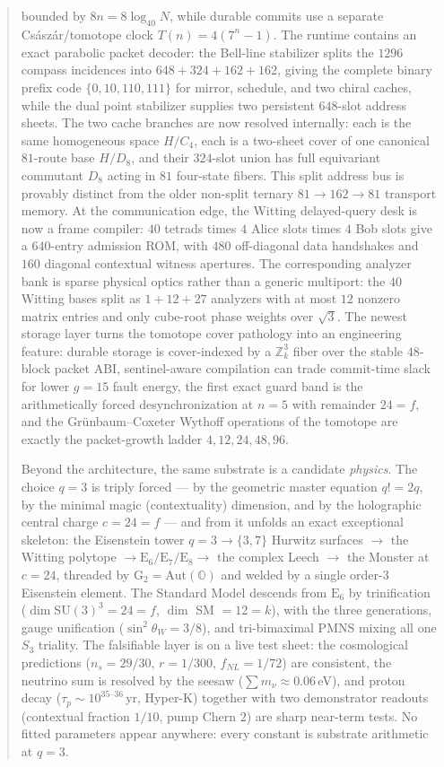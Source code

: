 \documentclass[11pt]{article}
\begin{document}
\begin{abstract}
bounded by $8n=8\log_{40}N$, while durable commits use a separate
Cs\'asz\'ar/tomotope clock $T(n)=4(7^n-1)$.  The runtime contains an
exact parabolic packet decoder: the Bell-line stabilizer splits the
    $1296$ compass incidences into $648+324+162+162$, giving the complete
    binary prefix code $\{0,10,110,111\}$ for mirror, schedule, and two
    chiral caches, while the dual point stabilizer supplies two persistent
    $648$-slot address sheets.  The two cache branches are now resolved
    internally: each is the same homogeneous space $H/C_4$, each is a
    two-sheet cover of one canonical $81$-route base $H/D_8$, and their
    $324$-slot union has full equivariant commutant $D_8$ acting in $81$
    four-state fibers.  This split address bus is provably distinct from
    the older non-split ternary $81\to162\to81$ transport memory.  At the
    communication edge, the Witting delayed-query desk is now a frame
    compiler: $40$ tetrads times $4$ Alice slots times $4$ Bob slots give
    a $640$-entry admission ROM, with $480$ off-diagonal data handshakes
    and $160$ diagonal contextual witness apertures.  The corresponding
    analyzer bank is sparse physical optics rather than a generic multiport:
    the $40$ Witting bases split as $1+12+27$ analyzers with at most $12$
    nonzero matrix entries and only cube-root phase weights over $\sqrt3$.
    The newest storage layer
turns the tomotope cover pathology into an engineering feature: durable
storage is cover-indexed by a $\mathbb{Z}_k^3$ fiber over the stable
$48$-block packet ABI, sentinel-aware compilation can trade commit-time
slack for lower $g=15$ fault energy, the first exact guard band is the
arithmetically forced desynchronization at $n=5$ with remainder
$24=f$, and the Gr\"unbaum--Coxeter Wythoff operations of the tomotope
are exactly the packet-growth ladder $4,12,24,48,96$.

Beyond the architecture, the same substrate is a candidate \emph{physics}. The
choice $q=3$ is triply forced --- by the geometric master equation $q!=2q$, by
the minimal magic (contextuality) dimension, and by the holographic central
charge $c=24=f$ --- and from it unfolds an exact exceptional skeleton: the
Eisenstein tower $q=3\to\{3,7\}$ Hurwitz surfaces $\to$ the Witting polytope
$\to\mathrm E_6/\mathrm E_7/\mathrm E_8\to$ the complex Leech $\to$ the Monster
at $c=24$, threaded by $\mathrm G_2=\mathrm{Aut}(\mathbb O)$ and welded by a
single order-$3$ Eisenstein element.  The Standard Model descends from
$\mathrm E_6$ by trinification ($\dim\mathrm{SU}(3)^3=24=f$, $\dim$ SM $=12=k$),
with the three generations, gauge unification ($\sin^2\theta_W=3/8$), and
tri-bimaximal PMNS mixing all one $S_3$ triality.  The falsifiable layer is on a
live test sheet: the cosmological predictions ($n_s=29/30$, $r=1/300$,
$f_{NL}=1/72$) are consistent, the neutrino sum is resolved by the seesaw
($\sum m_\nu\approx0.06$\,eV), and proton decay ($\tau_p\sim10^{35\text{--}36}$\,yr,
Hyper-K) together with two demonstrator readouts (contextual fraction $1/10$,
pump Chern $2$) are sharp near-term tests.  No fitted
parameters appear anywhere: every constant is substrate arithmetic at
$q=3$.
\end{abstract}
\end{document}
